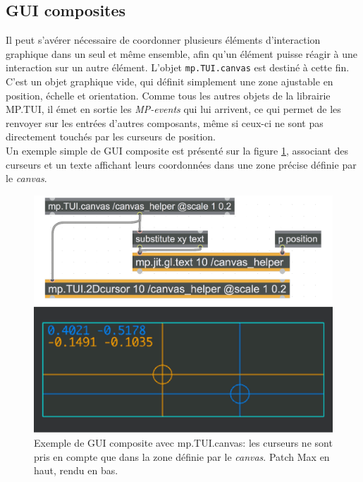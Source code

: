 \subsection{GUI composites}

\noindent Il peut s'avérer nécessaire de coordonner plusieurs éléments d'interaction graphique dans un seul et même ensemble, afin qu'un élément puisse réagir à une interaction sur un autre élément. L'objet \verb|mp.TUI.canvas| est destiné à cette fin. C'est un objet graphique vide, qui définit simplement une zone ajustable en position, échelle et orientation. Comme tous les autres objets de la librairie MP.TUI, il émet en sortie les \textit{MP-events} qui lui arrivent, ce qui permet de les renvoyer sur les entrées d'autres composants, même si ceux-ci ne sont pas directement touchés par les curseurs de position.\\
\indent Un exemple simple de \gls{GUI} composite est présenté sur la figure \ref{fig:visual_representation:canvas}, associant des curseurs et un texte affichant leurs coordonnées dans une zone précise définie par le \textit{canvas}.


\begin{figure}[!htbp]
	\captionsetup{format=plain}%
	\includegraphics[width=\textwidth]{gfx/06_visual_representation/mpTUI_canvas.pdf}
	\caption[Exemple de GUI composite avec mp.TUI.canvas]{Exemple de GUI composite avec mp.TUI.canvas: les curseurs ne sont pris en compte que dans la zone définie par le \textit{canvas}. Patch Max en haut, rendu en bas.}
	\label{fig:visual_representation:canvas}
\end{figure}

